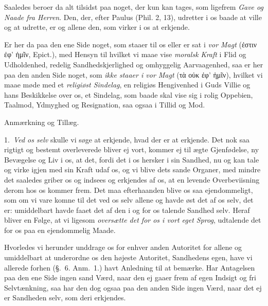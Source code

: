 \documentclass[12pt,a4paper]{book}
\newcommand{\apage}[1]{\marginnote{\footnotesize\textit{[#1]}}}
\begin{document}
Saaledes beroer da alt tilsidst paa noget, der kun kan tages, som ligefrem
\emph{Gave og Naade fra Herren}. Den, der, efter Paulus (Phil. 2, 13), udretter i
os baade at ville og at udrette, er og allene den, som virker i os at erkjende.

\apage{167} Er her da paa den ene Side noget, som staaer til os eller er sat i \emph{vor Magt}
(ἐστιν ἐφ' ἡμῖν, Epict.), med Hensyn til hvilket vi maae vise \emph{moralsk Kraft}
i Flid og Udholdenhed, redelig Sandhedskjerlighed og omhyggelig Aarvaagenhed, saa
er her paa den anden Side noget, som \emph{ikke staaer i vor Magt} (τὰ οὐκ ἐφ'
ἡμῖν),%
 hvilket vi maae møde med et \emph{religiøst Sindelag}, en religiøs Hengivenhed i
Guds Villie og hans Beskikkelse over os, et Sindelag, som baade skal vise sig i
rolig Oppebien, Taalmod, Ydmyghed og Resignation, saa ogsaa i Tillid og Mod.

\begin{center}Anmærkning og Tillæg.\end{center}

1.~\emph{Ved os selv} skulle vi søge at erkjende, hvad der er at erkjende. Det nok saa
rigtigt og bestemt overleverede bliver ej vort, kommer ej til ægte Gjenfødelse, ny
Bevægelse og Liv i os, at det, fordi det i os hersker i sin Sandhed, nu og kan
tale og virke igjen med sin Kraft udaf os, og vi blive dets sande Organer, med
mindre det saaledes griber os og indsees og erkjendes af os, at en levende
Overbeviisning derom hos os kommer frem. Det maa efterhaanden blive os saa
ejendommeligt, som om vi vare komne til det ved os selv allene og havde øst det af
os selv, det er: umiddelbart havde faaet det af den i og for os talende Sandhed
selv. Heraf bliver en Følge, at \apage{168} vi ligesom \emph{oversætte det for os i vort eget Sprog},
udtalende det for os paa en ejendommelig Maade.

Hvorledes vi herunder unddrage os for enhver anden Autoritet for allene og
umiddelbart at underordne os den højeste Autoritet, Sandhedens egen, have vi
allerede forhen (§.~6. Anm.~1.) havt Anledning til at bemærke. Har Antagelsen paa
den ene Side ingen sand Værd, naar den ej gaaer frem af egen Indsigt og fri
Selvtænkning, saa har den dog ogsaa paa den anden Side ingen Værd, naar det ej er
Sandheden selv, som deri erkjendes.
\end{document}
